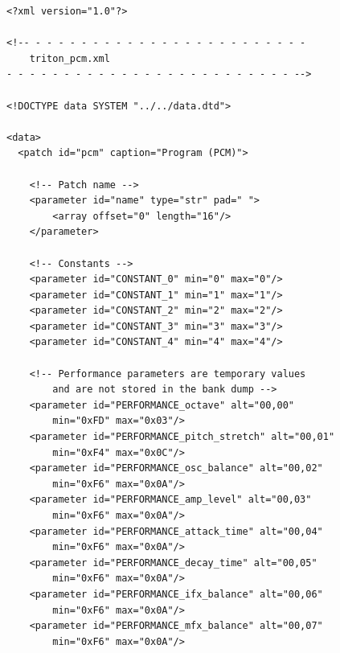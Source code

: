 \documentclass[a4paper,twoside,12pt]{article}
\begin{document}
\begin{verbatim}
<?xml version="1.0"?>

<!-- - - - - - - - - - - - - - - - - - - - - - - - -
    triton_pcm.xml
- - - - - - - - - - - - - - - - - - - - - - - - - -->

<!DOCTYPE data SYSTEM "../../data.dtd">

<data>
  <patch id="pcm" caption="Program (PCM)">

    <!-- Patch name -->
    <parameter id="name" type="str" pad=" ">
        <array offset="0" length="16"/>
    </parameter>

    <!-- Constants -->
    <parameter id="CONSTANT_0" min="0" max="0"/>
    <parameter id="CONSTANT_1" min="1" max="1"/>
    <parameter id="CONSTANT_2" min="2" max="2"/>
    <parameter id="CONSTANT_3" min="3" max="3"/>
    <parameter id="CONSTANT_4" min="4" max="4"/>

    <!-- Performance parameters are temporary values
        and are not stored in the bank dump -->
    <parameter id="PERFORMANCE_octave" alt="00,00"
        min="0xFD" max="0x03"/>
    <parameter id="PERFORMANCE_pitch_stretch" alt="00,01"
        min="0xF4" max="0x0C"/>
    <parameter id="PERFORMANCE_osc_balance" alt="00,02"
        min="0xF6" max="0x0A"/>
    <parameter id="PERFORMANCE_amp_level" alt="00,03"
        min="0xF6" max="0x0A"/>
    <parameter id="PERFORMANCE_attack_time" alt="00,04"
        min="0xF6" max="0x0A"/>
    <parameter id="PERFORMANCE_decay_time" alt="00,05"
        min="0xF6" max="0x0A"/>
    <parameter id="PERFORMANCE_ifx_balance" alt="00,06"
        min="0xF6" max="0x0A"/>
    <parameter id="PERFORMANCE_mfx_balance" alt="00,07"
        min="0xF6" max="0x0A"/>


\end{verbatim}
\end{document}
